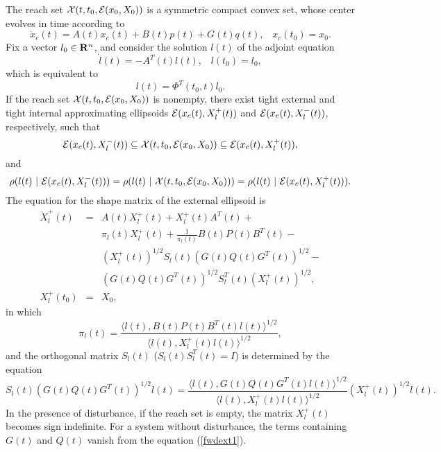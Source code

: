 The reach set $\XX(t,t_0,\EE(x_0,X_0))$ is a symmetric compact convex set,
whose center evolves in time according to
\begin{equation}
\dot{x}_c(t) = A(t)x_c(t) + B(t)p(t) + G(t)q(t), \;\;\;
x_c(t_0)=x_0. \label{fwdcenter}
\end{equation}
Fix a vector $l_0\in{\bf R}^n$, and consider the solution $l(t)$ of
the adjoint equation
\begin{equation}
\dot{l}(t) = -A^T(t)l(t), \;\;\; l(t_0) = l_0,
\label{adjointct}
\end{equation}
which is equivalent to
\[ l(t) = \Phi^T(t_0, t)l_0. \]
If the reach set $\XX(t, t_0, \EE(x_0,X_0))$ is nonempty,
there exist tight external and
tight internal approximating ellipsoids $\EE(x_c(t), X^+_l(t))$ and
$\EE(x_c(t), X^-_l(t))$, respectively, such that
\begin{equation}
\EE(x_c(t), X^-_l(t))\subseteq\XX(t,t_0,\EE(x_0,X_0))
\subseteq \EE(x_c(t), X^+_l(t)),
\label{fwdinclusion}
\end{equation}
and
\begin{equation}
\rho(l(t) ~|~ \EE(x_c(t), X^-_l(t))) =
\rho(l(t) ~|~ \XX(t, t_0, \EE(x_0,X_0))) =
\rho(l(t) ~|~ \EE(x_c(t), X^+_l(t))) .
\label{fwdtightness}
\end{equation}
The equation for the shape matrix of the external ellipsoid is
\begin{eqnarray}
\dot{X}^+_l(t) & = & A(t)X^+_l(t) + X^+_l(t)A^T(t) +\nonumber \\
& & \pi_l(t)X^+_l(t) + \frac{1}{\pi_l(t)}B(t)P(t)B^T(t) -\nonumber \\
& & (X_l^{+}(t))^{1/2}S_l(t)(G(t)Q(t)G^T(t))^{1/2} \nonumber -\\
& & (G(t)Q(t)G^T(t))^{1/2}S_l^T(t)(X_l^{+}(t))^{1/2}, \label{fwdext1} \\
X^+_l(t_0) & = & X_0, \label{fwdext2}
\end{eqnarray}
in which
\[ \pi_l(t) = \frac{\langle l(t),
B(t)P(t)B^T(t)l(t)\rangle^{1/2}}{\langle l(t), X^+_l(t)l(t)\rangle^{1/2}}, \]
and the orthogonal matrix $S_l(t)$  ($S_l(t)S_l^T(t) = I$) is determined
by the equation
\[ S_l(t)(G(t)Q(t)G^T(t))^{1/2}l(t) = \frac{\langle l(t),
G(t)Q(t)G^T(t)l(t)\rangle^{1/2}}{\langle l(t),
X_l^+(t)l(t)\rangle^{1/2}}(X_l^{+}(t))^{1/2}l(t). \]
In the presence of disturbance, if the reach set is empty, the
matrix $X^+_l(t)$ becomes sign indefinite.
For a system without disturbance, the terms containing $G(t)$ and $Q(t)$
vanish from the equation (\ref{fwdext1}).

